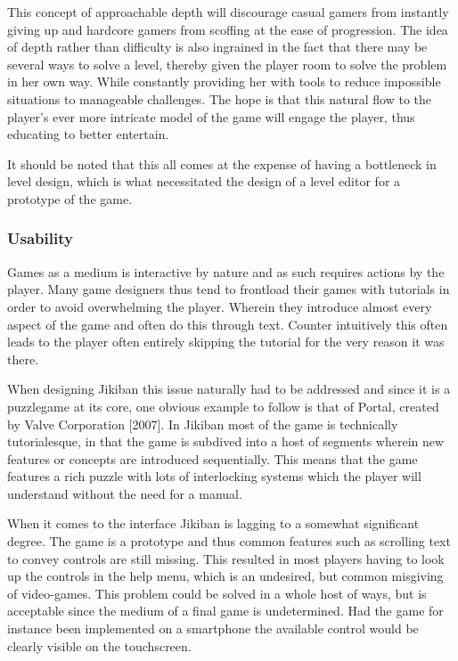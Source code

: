 This concept of approachable depth will discourage casual gamers from
instantly giving up and hardcore gamers from scoffing at the ease of
progression. The idea of depth rather than difficulty is also
ingrained in the fact that there may be several ways to solve a level,
thereby given the player room to solve the problem in her own
way. While constantly providing her with tools to reduce impossible
situations to manageable challenges. The hope is that this natural
flow to the player’s ever more intricate model of the game will engage
the player, thus educating to better entertain.

It should be noted that this all comes at the expense of having a
bottleneck in level design, which is what necessitated the design of a
level editor for a prototype of the game.


\subsubsection{Usability}
Games as a medium is interactive by nature and as such requires
actions by the player. Many game designers thus tend to frontload
their games with tutorials in order to avoid overwhelming the player.
Wherein they introduce almost every aspect of the game and often do
this through text. Counter intuitively this often leads to the player
often entirely skipping the tutorial for the very reason it was there.

When designing Jikiban this issue naturally had to be addressed and
since it is a puzzlegame at its core, one obvious example to follow is
that of Portal, created by Valve Corporation [2007]. In Jikiban most
of the game is technically tutorialesque, in that the game is subdived
into a host of segments wherein new features or concepts are
introduced sequentially. This means that the game features a rich
puzzle with lots of interlocking systems which the player will
understand without the need for a manual.

When it comes to the interface Jikiban is lagging to a somewhat
significant degree. The game is a prototype and thus common features
such as scrolling text to convey controls are still missing. This
resulted in most players having to look up the controls in the help
menu, which is an undesired, but common misgiving of video-games. This
problem could be solved in a whole host of ways, but is acceptable
since the medium of a final game is undetermined. Had the game for
instance been implemented on a smartphone the available control would
be clearly visible on the touchscreen.

